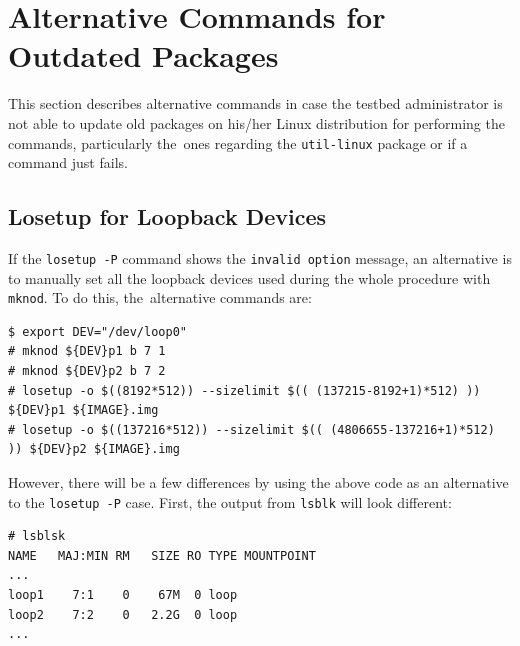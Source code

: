 \documentclass[electronics,article,accept,moreauthors,pdftex,10pt,a4paper]{mdpi}
\theoremstyle{mdpi}
\newcounter{ex}
\newcounter{re}
\theoremstyle{mdpidefinition}
\begin{document}
\appendix
%




% 

\section{Alternative Commands for Outdated Packages}
This section describes alternative commands in case the testbed administrator
is not able to update old packages on his/her Linux distribution for performing
the commands, particularly the~ones regarding the \texttt{util-linux} package
or if a command just fails.

\subsection{Losetup for Loopback Devices}
\label{sec:alternative_losetup}

If the \texttt{losetup -P} command shows the \texttt{invalid option}
message, an alternative is to manually set all the loopback devices
used during the whole procedure with \texttt{mknod}. To do this, the~alternative commands are:

\begin{lstlisting}[]
$ export DEV="/dev/loop0"
# mknod ${DEV}p1 b 7 1
# mknod ${DEV}p2 b 7 2
# losetup -o $((8192*512)) --sizelimit $(( (137215-8192+1)*512) )) ${DEV}p1 ${IMAGE}.img
# losetup -o $((137216*512)) --sizelimit $(( (4806655-137216+1)*512) )) ${DEV}p2 ${IMAGE}.img
\end{lstlisting}
\FloatBarrier
\vspace{-5mm}

However, there will be a few differences by using the above code as an
alternative to the \texttt{losetup -P} case. First, the output from
\texttt{lsblk} will look different:

\begin{lstlisting}[]
# lsblsk
NAME   MAJ:MIN RM   SIZE RO TYPE MOUNTPOINT
...
loop1    7:1    0    67M  0 loop
loop2    7:2    0   2.2G  0 loop
...
\end{lstlisting}
\FloatBarrier
\vspace{-5mm}
\end{document}
